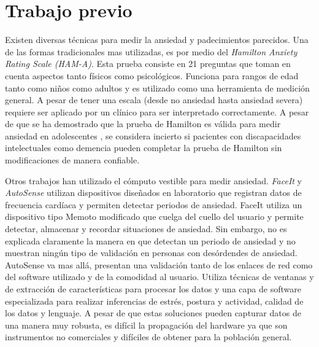 \documentclass[letterpaper,12pt]{cicese}
\begin{document}
		\chapter{Trabajo previo}
				Existen diversas t\'ecnicas para medir la ansiedad y padecimientos parecidos. Una de las formas tradicionales mas utilizadas, es por medio del \emph{Hamilton Anxiety Rating Scale (HAM-A)}\citep{Hamilton1959}. Esta prueba consiste en 21 preguntas que toman en cuenta aspectos tanto f\'isicos como psicol\'ogicos. Funciona para rangos de edad tanto como ni\~nos como adultos y es utilizado como una herramienta de medici\'on general. A pesar de tener una escala (desde no ansiedad hasta ansiedad severa)  requiere ser aplicado por un cl\'inico para ser interpretado correctamente. A pesar de que se ha demostrado que la prueba de Hamilton es v\'alida para medir ansiedad en adolescentes \citep{CLARK1994354}, se considera incierto si pacientes con discapacidades intelectuales como demencia pueden completar la prueba de Hamilton sin modificaciones de manera confiable\citep{Bradford2013125}.

				Otros trabajos han utilizado el c\'omputo vestible para medir ansiedad. {\emph{FaceIt}\citep{Rennert2013}} y {\emph{AutoSense}\citep{Ertin2011}} utilizan dispositivos dise\~nados en laboratorio que registran datos de frecuencia card\'iaca y permiten detectar periodos de ansiedad. FaceIt utiliza un dispositivo tipo Memoto modificado que cuelga del cuello del usuario y permite detectar, almacenar y recordar situaciones de ansiedad. Sin embargo, no es explicada claramente la manera en que detectan un periodo de ansiedad y no muestran ning\'un tipo de validaci\'on en personas con des\'ordendes de ansiedad. AutoSense va mas all\'a, presentan una validaci\'on tanto de los enlaces de red como del software utilizado y de la comodidad al usuario. Utiliza t\'ecnicas de ventanas y de extracci\'on de caracter\'isticas para procesar los datos y una capa de software especializada para realizar inferencias de estr\'es, postura y actividad, calidad de los datos y lenguaje. A pesar de que estas soluciones pueden capturar datos de una manera muy robusta, es dif\'icil la propagaci\'on del hardware ya que son instrumentos no comerciales y dif\'iciles de obtener para la poblaci\'on general.
	
\end{document}
